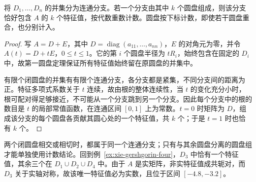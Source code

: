 \begin{theorem}
\label{thm:xie-gershgorin-second}
将 $D_1,\ldots,D_n$ 的并集分为连通分支。若一个分支由其中 $k$ 个圆盘组成，则该分支恰好包含 $A$ 的 $k$ 个特征值，按代数重数计数。圆盘按下标计数，即使若干圆盘重合，也分别计入。
\end{theorem}
\begin{proof}
写 $A=D+E$，其中 $D=\operatorname{diag}(a_{11},\ldots,a_{nn})$，$E$ 的对角元为零，并令 $A(t)=D+tE$，$0\leq t\leq1$。它的第 $i$ 个圆盘半径为 $tR_i$，始终包含在固定的 $D_i$ 中，故第一圆盘定理保证所有特征值始终留在原圆盘的并集中。

有限个闭圆盘的并集有有限个连通分支，各分支都是紧集，不同分支间的距离为正。特征多项式系数关于 $t$ 连续，故由根的整体连续性，当 $t$ 的变化充分小时，根可配对得足够接近，不可能从一个分支跳到另一个分支。因此每个分支中的根的数目是 $t$ 的局部常值函数，在连通区间 $[0,1]$ 上为常数。$t=0$ 时矩阵为 $D$，组成该分支的每个圆盘各贡献其圆心处的一个特征值，共 $k$ 个；于是 $t=1$ 时也恰有 $k$ 个。
\end{proof}

两个闭圆盘相交或相切时，都属于同一个连通分支；只有与其余圆盘分离的圆盘组才能单独使用计数结论。回到例~\ref{ex:xie-gershgorin-four}，$D_3$ 中恰有一个特征值，其余三个在 $D_1\cup D_2\cup D_4$ 中。由于 $A$ 是实矩阵，非实特征值成共轭对，而 $D_3$ 关于实轴对称，故该唯一特征值必为实数，且位于区间 $[-4.8,-3.2]$。






